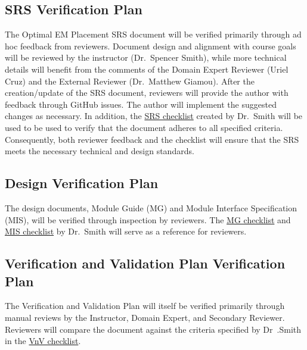 \documentclass[12pt, titlepage]{article}
\begin{document}
\subsection{SRS Verification Plan}
The Optimal EM Placement SRS document will be verified primarily through ad hoc feedback from reviewers. Document design and alignment with course goals will be reviewed by the instructor (Dr.~Spencer Smith), while more technical details will benefit from the comments of the Domain Expert Reviewer (Uriel Cruz) and the External Reviewer (Dr.~Matthew Giamou). After the creation/update of the SRS document, reviewers will provide the author with feedback through GitHub issues. The author will implement the suggested changes as necessary. In addition, the \href{https://github.com/husseinsd1/optimal-em-arrangement/blob/main/docs/Checklists/SRS-Checklist.pdf}{SRS checklist} created by Dr.~Smith will be used to be used to verify that the document adheres to all specified criteria. Consequently, both reviewer feedback and the checklist will ensure that the SRS meets the necessary technical and design standards.

\subsection{Design Verification Plan}
The design documents, Module Guide (MG) and Module Interface Specification (MIS), will be verified through inspection by reviewers. The \href{https://github.com/husseinsd1/optimal-em-arrangement/blob/main/docs/Checklists/MG-Checklist.pdf}{MG checklist} and \href{https://github.com/husseinsd1/optimal-em-arrangement/blob/main/docs/Checklists/MIS-Checklist.pdf}{MIS checklist} by Dr.~Smith will serve as a reference for reviewers. 

\subsection{Verification and Validation Plan Verification Plan}
The Verification and Validation Plan will itself be verified primarily through manual reviews by the Instructor, Domain Expert, and Secondary Reviewer. Reviewers will compare the document against the criteria specified by Dr~.Smith in the \href{https://github.com/husseinsd1/optimal-em-arrangement/blob/main/docs/Checklists/VnV-Checklist.pdf}{VnV checklist}.
\end{document}
